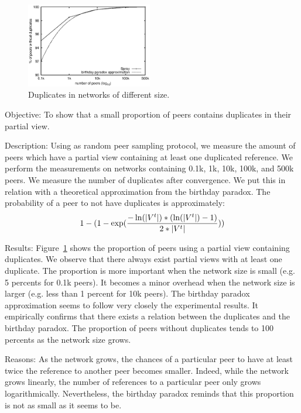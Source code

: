 \begin{figure}
  \centering
  \includegraphics[width=0.49\textwidth]{img/duplicates.eps}
  \caption{\label{fig:duplicates}Duplicates in networks of different size.}
\end{figure}

\begin{asparadesc} 
\item[Objective:] To show that a small proportion of peers contains duplicates
  in their partial view.
\item[Description:] Using \SPRAY as random peer sampling protocol, we measure
  the amount of peers which have a partial view containing at least one
  duplicated reference. We perform the measurements on networks containing
  0.1k, 1k, 10k, 100k, and 500k peers. We measure the number of duplicates
  after convergence. We put this in relation with a theoretical approximation
  from the birthday paradox. The probability of a peer to not have duplicates
  is approximately:
  \begin{equation*}
    1- 
    (1-
    \exp({-\ln(|V^t|)*(\ln(|V^t|)-1)\over{2*|V^t|}}))
  \end{equation*}
\item[Results:] Figure~\ref{fig:duplicates} shows the proportion of peers using
  a partial view containing duplicates. We observe that there always exist
  partial views with at least one duplicate. The proportion is more important
  when the network size is small (e.g. 5 percents for 0.1k peers). It becomes a
  minor overhead when the network size is larger (e.g. less than 1 percent for
  10k peers). The birthday paradox approximation seems to follow very closely
  the experimental results. It empirically confirms that there exists a relation
  between the duplicates and the birthday paradox. The proportion of peers
  without duplicates tends to 100 percents as the network size grows.
\item[Reasons:] As the network grows, the chances of a particular peer to have
  at least twice the reference to another peer becomes smaller. Indeed, while
  the network grows linearly, the number of references to a particular peer
  only grows logarithmically. Nevertheless, the birthday paradox reminds that
  this proportion is not as small as it seems to be.
\end{asparadesc}


